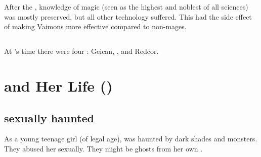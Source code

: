 After the \HundredScourges, knowledge of magic (seen as the highest and noblest of all sciences) was mostly preserved, but all other technology suffered. 
This had the side effect of making Vaimons more effective compared to non-mages. 









\subsection{\VaimonClans}
At \Belzir's time there were four \VaimonClans:
Geican, \Zether, \Delaen and Redcor. 















\section{\Belzir{} and Her Life ()}





\subsection{\Belzir sexually haunted}
As a young teenage girl (of legal age), \Belzir was haunted by dark shades and monsters. 
They abused her sexually. 
They might be ghosts from her own \carcer. 

